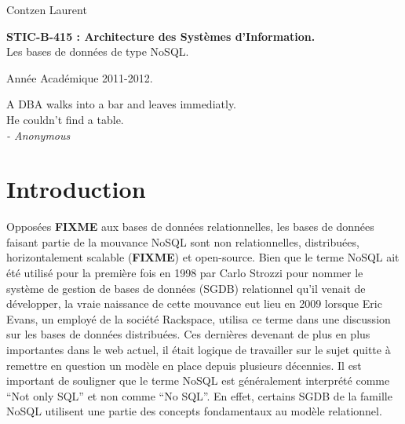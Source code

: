 \documentclass[11pt]{article}
\author{Contzen Laurent}
\begin{document}
\begin{titlepage}  
  \begin{flushleft}
    Contzen Laurent
  \end{flushleft}
  \begin{center}
    \vspace{80mm}\LARGE{\textbf{STIC-B-415 : Architecture des Systèmes d'Information.} \\    
      Les bases de données de type NoSQL.}
  \end{center}
  \begin{flushright}
    \vspace{90mm}
    Année Académique 2011-2012.             
  \end{flushright}
\end{titlepage}

\vspace*{\fill}
\begin{flushright}
  A DBA walks into a bar and leaves immediatly. \\
  He couldn't find a table. \\
  \textit{- Anonymous}
\end{flushright}
\vspace*{\fill}
\newpage
\tableofcontents
\newpage
\listoffigures
\listoftables
\newpage

\section{Introduction}
Opposées \colorbox{BrickRed}{\textbf{FIXME}} aux bases de données relationnelles, les bases de données faisant partie de la mouvance NoSQL sont non relationnelles, distribuées, horizontalement scalable (\colorbox{BrickRed}{\textbf{FIXME}}) et open-source. Bien que le terme NoSQL ait été utilisé pour la première fois en 1998 par Carlo Strozzi pour nommer le système de gestion de bases de données (SGDB) relationnel qu'il venait de développer, la vraie naissance de cette mouvance eut lieu en 2009 lorsque Eric Evans, un employé de la société Rackspace, utilisa ce terme dans une discussion sur les bases de données distribuées. Ces dernières devenant de plus en plus importantes dans le web actuel, il était logique de travailler sur le sujet quitte à remettre en question un modèle en place depuis plusieurs décennies. Il est important de souligner que le terme NoSQL est généralement interprété comme ``Not only SQL'' et non comme ``No SQL''. En effet, certains SGDB de la famille NoSQL utilisent une partie des concepts fondamentaux au modèle relationnel.
\end{document}
